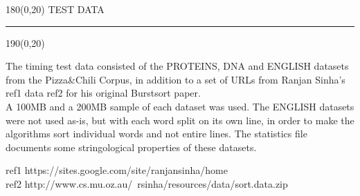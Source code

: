 %

\begin{textblock}{180}(0,20)
\sffamily\normalsize{\color{sciorange}TEST DATA}\small\\
\rule[3mm]{190mm}{0.1pt}
\end{textblock} 
\begin{textblock}{190}(0,20)
 \footnotesize 
\begin{multicols}{3}
The timing test data consisted of the PROTEINS, DNA and ENGLISH datasets from the Pizza\&Chili Corpus, in addition to a set of URLs from Ranjan Sinha's ref1 data ref2 for his original Burstsort paper. \\

A 100MB and a 200MB sample of each dataset was used. The ENGLISH datasets were not used as-is, but with each word split on its own line, in order to make the algorithms sort individual words and not entire lines. The statistics file documents some stringological properties of these datasets.

ref1 https://sites.google.com/site/ranjansinha/home \\
ref2 http://www.cs.mu.oz.au/~rsinha/resources/data/sort.data.zip \\
\end{multicols}

\end{textblock} 

